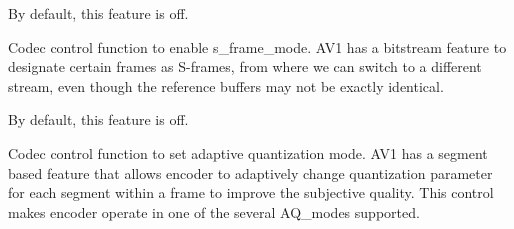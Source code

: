\begin{Desc}
\begin{description}
By default, this feature is off. \item[{\em 
A\+V1\+E\+\_\+\+S\+E\+T\+\_\+\+S\+\_\+\+F\+R\+A\+M\+E\+\_\+\+M\+O\+DE\hypertarget{group__aom__encoder_ggae78dde67a6d78f332e9bdba0dde42db5a3ec44c6d8987ca88f8f635b7c098c11e}{}\label{group__aom__encoder_ggae78dde67a6d78f332e9bdba0dde42db5a3ec44c6d8987ca88f8f635b7c098c11e}
}]Codec control function to enable s\+\_\+frame\+\_\+mode. A\+V1 has a bitstream feature to designate certain frames as S-\/frames, from where we can switch to a different stream, even though the reference buffers may not be exactly identical.

By default, this feature is off. \item[{\em 
A\+V1\+E\+\_\+\+S\+E\+T\+\_\+\+A\+Q\+\_\+\+M\+O\+DE\hypertarget{group__aom__encoder_ggae78dde67a6d78f332e9bdba0dde42db5a17bd297efc31082157785d68fc5a6067}{}\label{group__aom__encoder_ggae78dde67a6d78f332e9bdba0dde42db5a17bd297efc31082157785d68fc5a6067}
}]Codec control function to set adaptive quantization mode. A\+V1 has a segment based feature that allows encoder to adaptively change quantization parameter for each segment within a frame to improve the subjective quality. This control makes encoder operate in one of the several A\+Q\+\_\+modes supported.


\end{description}
\end{Desc}
